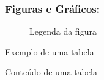 \documentclass[12pt,openright,twoside]{report}
\begin{document}
\subsubsection{Figuras e Gráficos:}

\begin{figure}[h] %
\centerline{} %
\caption{Legenda da figura}
\end{figure}

\begin{table}[htp]
\caption{Exemplo de uma tabela}
\centerline{Conteúdo de uma tabela}
\label{tabela-exemplo}
\end{table}
\end{document}
